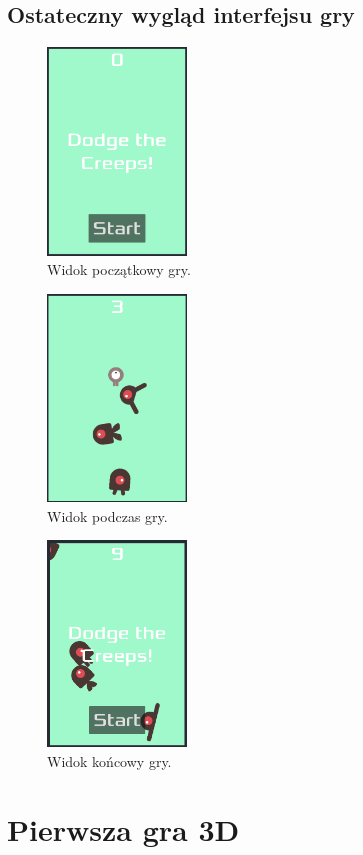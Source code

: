 \documentclass[a4paper,12pt]{article}
\begin{document}
\newpage
\subsection{Ostateczny wygląd interfejsu gry}

\begin{figure}[htb]
    \centering
    \includegraphics[width=0.33\textwidth]{begin.png}
    \caption{Widok początkowy gry.}
    \label{fig:begin1}
\end{figure}

\begin{figure}[htb]
    \centering
    \includegraphics[width=0.33\textwidth]{play.png}
    \caption{Widok podczas gry.}
    \label{fig:play1}
\end{figure}

\begin{figure}[h]
    \centering
    \includegraphics[width=0.33\textwidth]{end.png}
    \caption{Widok końcowy gry.}
    \label{fig:end1}
\end{figure}

\newpage
\section{Pierwsza gra 3D}
\end{document}
